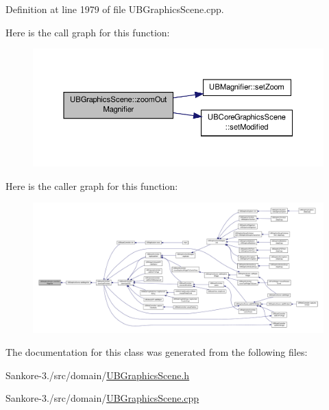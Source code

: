 Definition at line 1979 of file U\-B\-Graphics\-Scene.\-cpp.



Here is the call graph for this function\-:
\nopagebreak
\begin{figure}[H]
\begin{center}
\leavevmode
\includegraphics[width=350pt]{dc/db2/class_u_b_graphics_scene_a7cd496f1aae3c1ab0f372fa2e9a75370_cgraph}
\end{center}
\end{figure}




Here is the caller graph for this function\-:
\nopagebreak
\begin{figure}[H]
\begin{center}
\leavevmode
\includegraphics[width=350pt]{dc/db2/class_u_b_graphics_scene_a7cd496f1aae3c1ab0f372fa2e9a75370_icgraph}
\end{center}
\end{figure}




The documentation for this class was generated from the following files\-:\begin{DoxyCompactItemize}
\item 
Sankore-\/3./src/domain/\hyperlink{_u_b_graphics_scene_8h}{U\-B\-Graphics\-Scene.\-h}\item 
Sankore-\/3./src/domain/\hyperlink{_u_b_graphics_scene_8cpp}{U\-B\-Graphics\-Scene.\-cpp}\end{DoxyCompactItemize}

